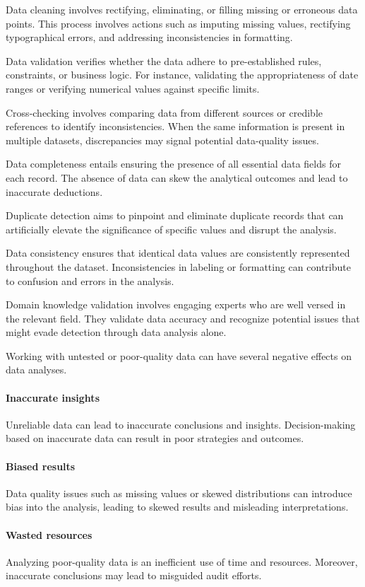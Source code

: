 Data cleaning involves rectifying, eliminating, or filling missing or erroneous data points. This process involves actions such as imputing missing values, rectifying typographical errors, and addressing inconsistencies in formatting.

Data validation verifies whether the data adhere to pre-established rules, constraints, or business logic. For instance, validating the appropriateness of date ranges or verifying numerical values against specific limits.

Cross-checking involves comparing data from different sources or credible references to identify inconsistencies. When the same information is present in multiple datasets, discrepancies may signal potential data-quality issues.

Data completeness entails ensuring the presence of all essential data fields for each record. The absence of data can skew the analytical outcomes and lead to inaccurate deductions.

Duplicate detection aims to pinpoint and eliminate duplicate records that can artificially elevate the significance of specific values and disrupt the analysis.

Data consistency ensures that identical data values are consistently represented throughout the dataset. Inconsistencies in labeling or formatting can contribute to confusion and errors in the analysis.

Domain knowledge validation involves engaging experts who are well versed in the relevant field. They validate data accuracy and recognize potential issues that might evade detection through data analysis alone.

\bigskip
Working with untested or poor-quality data can have several negative effects on data analyses.

\paragraph{Inaccurate insights} Unreliable data can lead to inaccurate conclusions and insights. Decision-making based on inaccurate data can result in poor strategies and outcomes.
\paragraph{Biased results} Data quality issues such as missing values or skewed distributions can introduce bias into the analysis, leading to skewed results and misleading interpretations.
\paragraph{Wasted resources}
Analyzing poor-quality data is an inefficient use of time and resources. Moreover, inaccurate conclusions may lead to misguided audit efforts.
